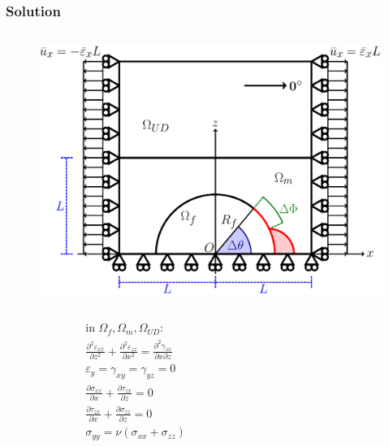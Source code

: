 \documentclass[first,firstsupp,lastsupp,last,hyperref,table]{ETHclass}
\begin{document}
\begin{frame}
\frametitle{\vspace{0.4cm}\small Solution}
\vspace{-1.1cm}
\centering
\begin{columns}
\begin{column}{0.6\textwidth}
\begin{figure}
\includegraphics[width=0.825\columnwidth]{RUC.pdf}
\end{figure}
\vspace{-1cm}
\begin{columns}
\begin{column}{0.3\columnwidth}
\tiny
\begin{equation*}
\begin{aligned}
&\text{in }\Omega_{f}, \Omega_{m}, \Omega_{UD}:\\
&\frac{\partial^{2}\varepsilon_{xx}}{\partial z^{2}}+\frac{\partial^{2}\varepsilon_{zz}}{\partial x^{2}}=\frac{\partial^{2}\gamma_{zx}}{\partial x\partial z}\\
&\varepsilon_{y}=\gamma_{xy}=\gamma_{yz}=0\\
&\frac{\partial\sigma_{xx}}{\partial x}+\frac{\partial\tau_{zx}}{\partial z} = 0\\
&\frac{\partial\tau_{zx}}{\partial x}+\frac{\partial\sigma_{zz}}{\partial z} = 0\\
&\sigma_{yy}=\nu\left(\sigma_{xx}+\sigma_{zz}\right)\\
\end{aligned}
\end{equation*}
\end{column}
\begin{column}{0.7\columnwidth}
\tiny
\begin{equation*}
\begin{aligned}

\end{aligned}
\end{equation*}
\end{column}
\end{columns}
\end{column}
\end{columns}
\end{frame}
\end{document}
